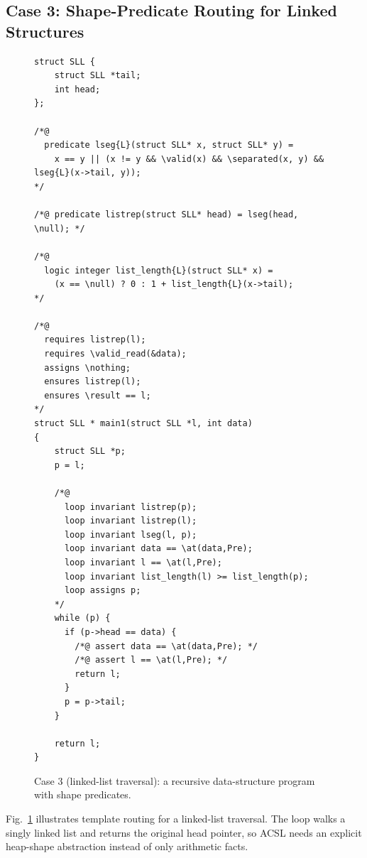 \subsection{Case 3: Shape-Predicate Routing for Linked Structures}

\begin{figure}[!t]
    \centering
    \begin{tcolorbox}[casebox, title={Case 3: route-selected shape predicates}]
\begin{lstlisting}[style=caseinnerstyle]
struct SLL {
    struct SLL *tail;
    int head;
};

/*@
  predicate lseg{L}(struct SLL* x, struct SLL* y) =
    x == y || (x != y && \valid(x) && \separated(x, y) && lseg{L}(x->tail, y));
*/

/*@ predicate listrep(struct SLL* head) = lseg(head, \null); */

/*@
  logic integer list_length{L}(struct SLL* x) =
    (x == \null) ? 0 : 1 + list_length{L}(x->tail);
*/

/*@
  requires listrep(l);
  requires \valid_read(&data);
  assigns \nothing;
  ensures listrep(l);
  ensures \result == l;
*/
struct SLL * main1(struct SLL *l, int data)
{
    struct SLL *p;
    p = l;

    /*@
      loop invariant listrep(p);
      loop invariant listrep(l);
      loop invariant lseg(l, p);
      loop invariant data == \at(data,Pre);
      loop invariant l == \at(l,Pre);
      loop invariant list_length(l) >= list_length(p);
      loop assigns p;
    */
    while (p) {
      if (p->head == data) {
        /*@ assert data == \at(data,Pre); */
        /*@ assert l == \at(l,Pre); */
        return l;
      }
      p = p->tail;
    }

    return l;
}
\end{lstlisting}
    \end{tcolorbox}
    \caption{Case 3 (linked-list traversal): a recursive data-structure program with shape predicates.}
    \label{fig:case4}
\end{figure}

Fig.~\ref{fig:case4} illustrates template routing for a linked-list traversal. The loop walks a singly linked list and returns the original head pointer, so ACSL needs an explicit heap-shape abstraction instead of only arithmetic facts.

